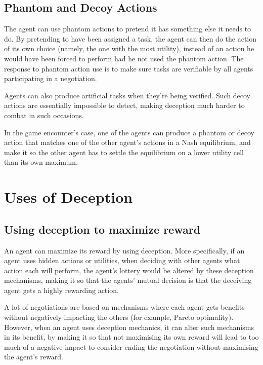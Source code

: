 \documentclass{aamas2017}
\begin{document}
    \subsection{Phantom and Decoy Actions}
        \par 
        The agent can use phantom actions to pretend it has something else it needs to do. By pretending to have been assigned a task, the agent can then do the action of its own choice (namely, the one with the most utility), instead of an action he would have been forced to perform had he not used the phantom action. The response to phantom action use is to make sure tasks are verifiable by all agents participating in a negotiation.
        \par 
        Agents can also produce artificial tasks when they're being verified. Such decoy actions are essentially impossible to detect, making deception much harder to combat in such occasions.
        \par
        In the game encounter's case, one of the agents can produce a phantom or decoy action that matches one of the other agent's actions in a Nash equilibrium, and make it so the other agent has to settle the equilibrium on a lower utility cell than its own maximum.

\section{Uses of Deception}
    \subsection{Using deception to maximize reward}
        \par
        An agent can maximize its reward by using deception. More specifically, if an agent uses hidden actions or utilities, when deciding with other agents what action each will perform, the agent's lottery would be altered by these deception mechanisms, making it so that the agents' mutual decision is that the deceiving agent gets a highly rewarding action.
        \par
        A lot of negotiations are based on mechanisms where each agent gets benefits without negatively impacting the others (for example, Pareto optimality). However, when an agent uses deception mechanics, it can alter such mechanisms in its benefit, by making it so that not maximising its own reward will lead to too much of a negative impact to consider ending the negotiation without maximising the agent's reward.
\end{document}
